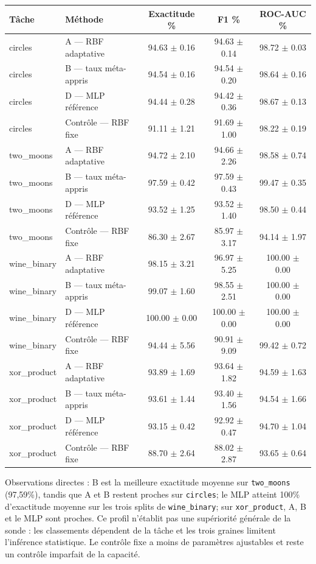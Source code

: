 \documentclass[11pt,a4paper]{article}
\begin{document}
\begin{center}\scriptsize
\begin{longtable}{llccc}
\toprule
\textbf{Tâche} & \textbf{Méthode} & \textbf{Exactitude \%} & \textbf{F1 \%} & \textbf{ROC-AUC \%}\\
\midrule\endhead
circles & A — RBF adaptative & 94.63 $\pm$ 0.16 & 94.63 $\pm$ 0.14 & 98.72 $\pm$ 0.03 \\
circles & B — taux méta-appris & 94.54 $\pm$ 0.16 & 94.54 $\pm$ 0.20 & 98.64 $\pm$ 0.16 \\
circles & D — MLP référence & 94.44 $\pm$ 0.28 & 94.42 $\pm$ 0.36 & 98.67 $\pm$ 0.13 \\
circles & Contrôle — RBF fixe & 91.11 $\pm$ 1.21 & 91.69 $\pm$ 1.00 & 98.22 $\pm$ 0.19 \\
two\_moons & A — RBF adaptative & 94.72 $\pm$ 2.10 & 94.66 $\pm$ 2.26 & 98.58 $\pm$ 0.74 \\
two\_moons & B — taux méta-appris & 97.59 $\pm$ 0.42 & 97.59 $\pm$ 0.43 & 99.47 $\pm$ 0.35 \\
two\_moons & D — MLP référence & 93.52 $\pm$ 1.25 & 93.52 $\pm$ 1.40 & 98.50 $\pm$ 0.44 \\
two\_moons & Contrôle — RBF fixe & 86.30 $\pm$ 2.67 & 85.97 $\pm$ 3.17 & 94.14 $\pm$ 1.97 \\
wine\_binary & A — RBF adaptative & 98.15 $\pm$ 3.21 & 96.97 $\pm$ 5.25 & 100.00 $\pm$ 0.00 \\
wine\_binary & B — taux méta-appris & 99.07 $\pm$ 1.60 & 98.55 $\pm$ 2.51 & 100.00 $\pm$ 0.00 \\
wine\_binary & D — MLP référence & 100.00 $\pm$ 0.00 & 100.00 $\pm$ 0.00 & 100.00 $\pm$ 0.00 \\
wine\_binary & Contrôle — RBF fixe & 94.44 $\pm$ 5.56 & 90.91 $\pm$ 9.09 & 99.42 $\pm$ 0.72 \\
xor\_product & A — RBF adaptative & 93.89 $\pm$ 1.69 & 93.64 $\pm$ 1.82 & 94.59 $\pm$ 1.63 \\
xor\_product & B — taux méta-appris & 93.61 $\pm$ 1.44 & 93.40 $\pm$ 1.56 & 94.54 $\pm$ 1.66 \\
xor\_product & D — MLP référence & 93.15 $\pm$ 0.42 & 92.92 $\pm$ 0.47 & 94.70 $\pm$ 1.04 \\
xor\_product & Contrôle — RBF fixe & 88.70 $\pm$ 2.64 & 88.02 $\pm$ 2.87 & 93.65 $\pm$ 0.64 \\
\bottomrule
\end{longtable}
\end{center}

Observations directes : B est la meilleure exactitude moyenne sur \texttt{two\_moons} (97,59\%), tandis que A et B restent proches sur \texttt{circles}; le MLP atteint 100\% d'exactitude moyenne sur les trois splits de \texttt{wine\_binary}; sur \texttt{xor\_product}, A, B et le MLP sont proches. Ce profil n'établit pas une supériorité générale de la sonde : les classements dépendent de la tâche et les trois graines limitent l'inférence statistique. Le contrôle fixe a moins de paramètres ajustables et reste un contrôle imparfait de la capacité.
\end{document}
